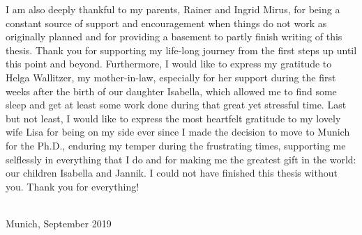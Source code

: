 I am also deeply thankful to my parents, Rainer and Ingrid Mirus, for being a constant source of support and encouragement when things do not work as originally planned and for providing a basement to partly finish writing of this thesis.
Thank you for supporting my life-long journey from the first steps up until this point and beyond.
Furthermore, I would like to express my gratitude to Helga Wallitzer, my mother-in-law, especially for her support during the first weeks after the birth of our daughter Isabella, which allowed me to find some sleep and get at least some work done during that great yet stressful time.
Last but not least, I would like to express the most heartfelt gratitude to my lovely wife Lisa for being on my side ever since I made the decision to move to Munich for the Ph.D., enduring my temper during the frustrating times, supporting me selflessly in everything that I do and for making me the greatest gift in the world: our children Isabella and Jannik.
I could not have finished this thesis without you.
Thank you for everything! 

\vspace{1cm}
\fullname\\
Munich, September 2019
